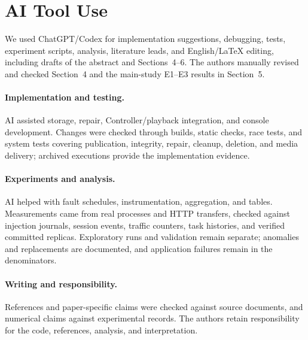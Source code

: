 \section{AI Tool Use}
We used ChatGPT/Codex for implementation suggestions, debugging, tests,
experiment scripts, analysis, literature leads, and English/LaTeX editing,
including drafts of the abstract and Sections~4--6. The authors manually
revised and checked Section~4 and the main-study E1--E3 results in Section~5.

\paragraph{Implementation and testing.}
AI assisted storage, repair, Controller/playback integration, and console
development. Changes were checked through builds, static checks, race tests,
and system tests covering publication, integrity, repair, cleanup, deletion,
and media delivery; archived executions provide the implementation evidence.

\paragraph{Experiments and analysis.}
AI helped with fault schedules, instrumentation, aggregation, and tables.
Measurements came from real processes and HTTP transfers, checked against
injection journals, session events, traffic counters, task histories, and
verified committed replicas. Exploratory runs and validation remain
separate; anomalies and replacements are documented, and application
failures remain in the denominators.

\paragraph{Writing and responsibility.}
References and paper-specific claims were checked against source documents,
and numerical claims against experimental records. The authors retain
responsibility for the code, references, analysis, and interpretation.

